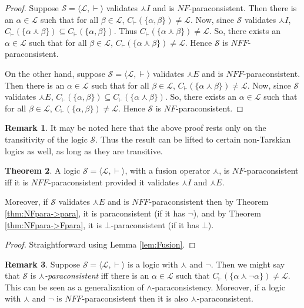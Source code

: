 \documentclass[submission]{eptcs}
\newcommand{\lang}{\mathcal{L}}
\newcommand{\fus}{\curlywedge}
\theoremstyle{definition}
\newtheorem{thm}{Theorem}[section]
\newtheorem{rem}[thm]{Remark}
\begin{document}
\begin{proof}
Suppose $\mathcal{S}=\langle\lang,\vdash\rangle$ validates $\fus I$ and is $NF$-paraconsistent. Then there is an $\alpha\in\lang$ such that for all  $\beta\in\lang$, $C_\vdash(\{\alpha,\beta\})\neq\lang$. Now, since $\mathcal{S}$ validates $\fus I$, $C_\vdash(\{\alpha\fus\beta\})\subseteq C_\vdash(\{\alpha,\beta\})$. Thus $C_\vdash(\{\alpha\fus\beta\})\neq\lang$. So, there exists an $\alpha\in\lang$ such that for all $\beta\in\lang$, $C_\vdash(\{\alpha\fus\beta\})\neq\lang$. Hence $\mathcal{S}$ is $NFF$-paraconsistent.

On the other hand, suppose $\mathcal{S}=\langle\lang,\vdash\rangle$ validates $\fus E$ and is $NFF$-paraconsistent. Then there is an $\alpha\in\lang$ such that for all $\beta\in\lang$, $C_\vdash(\{\alpha\fus\beta\})\neq\lang$. Now, since $\mathcal{S}$ validates $\fus E$, $C_\vdash(\{\alpha,\beta\})\subseteq C_\vdash(\{\alpha\fus\beta\})$. So, there exists an $\alpha\in\lang$ such that for all $\beta\in\lang$, $C_\vdash(\{\alpha,\beta\})\neq\lang$. Hence $\mathcal{S}$ is $NF$-paraconsistent.
\end{proof}

\begin{rem}
It may be noted here that the above proof rests only on the transitivity of the logic $\mathcal{S}$. Thus the result can be lifted to certain non-Tarskian logics as well, as long as they are transitive.
\end{rem}

\begin{thm}\label{thm:NF=NFF}
A logic $\mathcal{S}=\langle\lang,\vdash\rangle$, with a fusion operator $\fus$, is $NF$-paraconsistent iff it is $NFF$-paraconsistent provided it validates $\fus I$ and $\fus E$.

Moreover, if $\mathcal{S}$ validates $\fus E$ and is $NFF$-paraconsistent then by Theorem \ref{thm:NFpara->para}, it is paraconsistent (if it has $\neg$), and by Theorem \ref{thm:NFpara->Fpara}, it is $\bot$-paraconsistent (if it has $\bot$).
\end{thm}

\begin{proof}
Straightforward using Lemma \ref{lem:Fusion}.
\end{proof}

\begin{rem}
Suppose $\mathcal{S}=\langle\lang,\vdash\rangle$ is a logic with $\fus$ and $\neg$. Then we might say that $\mathcal{S}$ is \emph{$\fus$-pa\-ra\-con\-sis\-tent} iff there is an $\alpha\in\lang$ such that $C_\vdash(\{\alpha\fus\neg\alpha\})\neq\lang$. This can be seen as a generalization of $\land$-paraconsistency. Moreover, if a logic with $\fus$ and $\neg$ is $NFF$-paraconsistent then it is also $\fus$-paraconsistent.
\end{rem}
\end{document}
